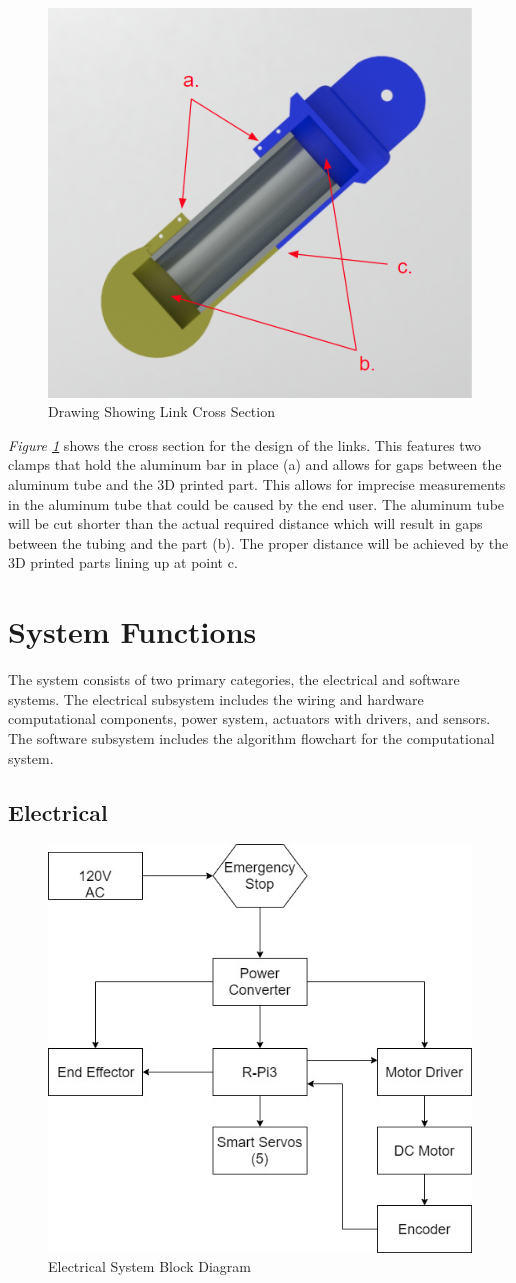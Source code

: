 \documentclass[12pt]{report}
\begin{document}
\begin{figure}[htp]
  \centering
  \includegraphics[frame,width=.5\textwidth]{link_cross_section}
  \caption{Drawing Showing Link Cross Section}
  \label{fig:link2}
\end{figure}
\newpage
\emph{Figure \ref{fig:link2}} shows the cross section for the design of the links. This features two clamps that hold the aluminum bar in place (a) and allows for gaps between the aluminum tube and the 3D printed part. This allows for imprecise measurements in the aluminum tube that could be caused by the end user. The aluminum tube will be cut shorter than the actual required distance which will result in gaps between the tubing and the part (b). The proper distance will be achieved by the 3D printed parts lining up at point c.

\section{System Functions}
The system consists of two primary categories, the electrical and software systems. The electrical subsystem includes the wiring and hardware computational components, power system, actuators with drivers, and sensors. The software subsystem includes the algorithm flowchart for the computational system.
\subsection{Electrical}
\begin{figure}[htp]
  \centering
  \includegraphics[width=.5\textwidth]{eblock}
  \caption{Electrical System Block Diagram}
  \label{fig:eblock}
\end{figure}
\end{document}

